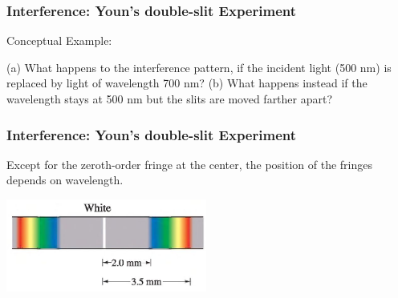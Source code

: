 \documentclass[]{beamer}
\begin{document}
\begin{frame}

\frametitle{Interference: Youn's double-slit Experiment}

Conceptual Example:
\vspace{3mm}

(a) What happens to the interference pattern, if the incident light
(500 nm) is replaced by light of wavelength 700 nm? (b) What happens instead if the
wavelength stays at 500 nm but the slits are moved farther apart?

  \end{frame}






\begin{frame}

\frametitle{Interference: Youn's double-slit Experiment}
Except for the zeroth-order fringe at the center, the position of the fringes depends on wavelength.

\vspace{3mm}

  \begin{center}
  \includegraphics[height=1.2in]{images5/colors.jpg}
\end{center}

  \end{frame}









\end{document}
